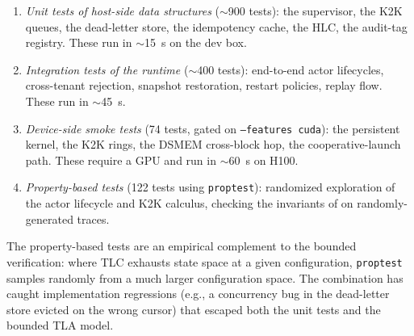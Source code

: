 \begin{enumerate}
\item \emph{Unit tests of host-side data structures}
($\sim$900 tests): the supervisor, the K2K queues, the dead-letter
store, the idempotency cache, the HLC, the audit-tag registry.
These run in $\sim$15~s on the dev box.

\item \emph{Integration tests of the runtime} ($\sim$400 tests):
end-to-end actor lifecycles, cross-tenant rejection, snapshot
restoration, restart policies, replay flow.  These run in
$\sim$45~s.

\item \emph{Device-side smoke tests} (74 tests, gated on
\texttt{--features cuda}): the persistent kernel, the K2K rings, the
DSMEM cross-block hop, the cooperative-launch path. These require a
GPU and run in $\sim$60~s on H100.

\item \emph{Property-based tests} (122 tests using
\texttt{proptest}): randomized exploration of the actor lifecycle
and K2K calculus, checking the invariants of
 on randomly-generated traces.
\end{enumerate}

The property-based tests are an empirical complement to the bounded
\TLA{} verification: where TLC exhausts state space at a given
configuration, \texttt{proptest} samples randomly from a much
larger configuration space.  The combination has caught
implementation regressions (e.g., a concurrency bug in the
dead-letter store evicted on the wrong cursor) that escaped both
the unit tests and the bounded TLA model.
